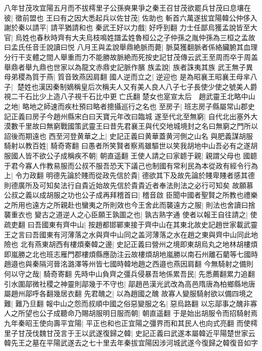 八年甘茂攻宜陽五月而不拔樗里子公孫奭果爭之秦王召甘茂欲罷兵甘茂曰息壤在彼|{
	徵前盟也}
王曰有之因大悉起兵以佐甘茂|{
	佐助也}
斬首六萬遂拔宜陽韓公仲侈入謝於秦以請平|{
	請平猶請和也}
秦武王好以力戲|{
	好呼到翻}
力士任鄙烏獲孟說皆至大官|{
	烏姓也春秋時齊有大夫烏枝鳴姓譜孟姓魯桓公之子仲孫之胤仲孫為三桓之孟故曰孟氏任音壬說讀曰悦}
八月王與孟說舉鼎絶脈而薨|{
	脈莫獲翻脈者係絡臟腑其血理分行干支體之間人舉重而力不能勝故脈絶而死按史記甘茂傳云武王至周而卒于周盖舉鼎者舉九鼎也世家以為龍文赤鼎史記脈作臏}
族孟說|{
	族者誅夷其族}
武王無子異母弟稷為質于燕|{
	質音致燕因肩翻}
國人逆而立之|{
	逆迎也}
是為昭襄王昭襄王母芈八子|{
	楚姓也漢因秦制嫡稱皇后次稱夫人又有美人良人八子七子長使少使之號美人爵視二千石比少上造八子視千石比中更亡氏翻}
楚女也寔宣太后　趙武靈王北略中山之地|{
	略地之師速而疾杜預曰略者摠攝巡行之名也}
至房子|{
	班志房子縣屬常山郡史記正義曰房子今趙州縣宋白曰天寶元年改曰臨城}
遂至代北至無窮|{
	自代北出塞外大漠數千里故曰無窮戰國策武靈王曰昔先君襄王與代交地城境封之名曰無窮之門所以詔後而期遠也}
西至河登黄華之上|{
	史記正義曰黄華蓋黄河側之山名}
與肥義謀胡服騎射以教百姓|{
	騎奇寄翻}
曰愚者所笑賢者察焉雖驅世以笑我胡地中山吾必有之遂胡服國人皆不欲公子成稱疾不朝|{
	朝直遥翻}
王使人請之曰家聼于親|{
	親謂父母也}
國聼于君今寡人作教易服而公叔不服吾恐天下議己也制國有常利民為本從政有經令行為上|{
	令力政翻}
明德先論於賤而從政先信於貴|{
	德欲其下及故先論於賤卑賤者感其德則德廣所及可知矣法行自貴近始故先信於貴貴近者奉法則法之必行可知矣}
故願慕公叔之義以成胡服之功也公子成再拜稽首曰|{
	稽音啟}
臣聞中國者聖賢之所教也禮樂之所用也遠方之所親赴也蠻夷之所則效也今王舍此而襲遠方之服|{
	則法也舍讀曰捨襲重衣也}
變古之道逆人之心臣願王孰圖之也|{
	孰古熟字通}
使者以報王自往請之|{
	使疏吏翻}
曰吾國東有齊中山|{
	按趙都邯鄲東接于齊中山在其東北故史記趙世家載武靈王之言曰吾國東有河薄落之水與齊中山同之盖河薄落之水在趙之東與齊中山同此地險也}
北有燕東胡西有樓煩秦韓之邊|{
	史記正義曰營州之境即東胡烏丸之地林胡樓煩即嵐勝之北也班志雁門郡樓煩縣應劭注云故樓煩胡地嵐勝以南石州離石藺等七國時趙邉也與秦隔河晉洺潞澤等州皆七國時韓地趙之西邉也燕因肩翻}
今無騎射之備則何以守之哉|{
	騎奇寄翻}
先時中山負齊之彊兵侵暴吾地係累吾民|{
	先悉薦翻累力追翻}
引水圍鄗微社稷之神靈則鄗幾于不守也|{
	鄗趙邑漢光武改為高邑隋唐為柏鄉縣地唐屬趙州鄗呼各翻幾居衣翻}
先君醜之|{
	以為趙國之醜}
故寡人變服騎射欲以備四境之難|{
	難乃旦翻}
報中山之怨而叔順中國之俗惡變服之名|{
	惡烏路翻}
以忘鄗事之醜非寡人之所望也公子成聽命乃賜胡服明日服而朝|{
	朝直遥翻}
于是始出胡服令而招騎射焉九年秦昭王使向壽平宜陽|{
	平正也和也正宜陽之彊界而和其民人也向式亮翻}
而使樗里子甘茂伐魏甘茂言于王以武遂復歸之韓|{
	史記正義曰武遂本屬韓近平陽楚世家云韓先王之墓在平陽武遂去之七十里去年秦拔宜陽因涉河城武遂今復歸之韓復音如字}
